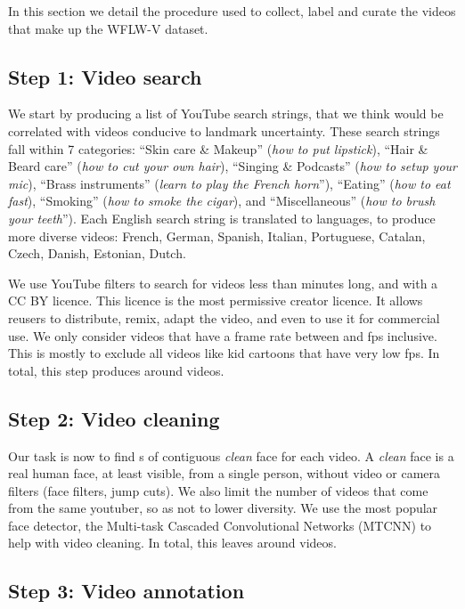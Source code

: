 \documentclass[10pt,twocolumn,letterpaper]{article}
\begin{document}
In this section we detail the procedure used to collect, label and curate the  videos that make up the WFLW-V dataset. 

\subsection*{Step 1: Video search}

We start by producing a list of  YouTube search strings, that we think would be correlated with videos conducive to landmark uncertainty. These search strings fall within 7 categories: ``Skin care \& Makeup'' (\eg \textit{how to put lipstick}), ``Hair \& Beard care'' (\eg \textit{how to cut your own hair}), ``Singing \& Podcasts'' (\eg \textit{how to setup your mic}), ``Brass instruments'' (\eg \textit{learn to play the French horn}''), ``Eating'' (\eg \textit{how to eat fast}), ``Smoking'' (\eg \textit{how to smoke the cigar}), and ``Miscellaneous'' (\eg \textit{how to brush your teeth}''). Each English search string is translated to  languages, to produce more diverse videos: French, German, Spanish, Italian, Portuguese, Catalan, Czech, Danish, Estonian, Dutch.

We use YouTube filters to search for videos less than  minutes long, and with a CC BY licence. This licence is the most permissive creator licence. It allows reusers to distribute, remix, adapt the video, and even to use it for commercial use. We only consider videos that have a frame rate between  and  fps inclusive. This is mostly to exclude all videos like kid cartoons that have very low fps. In total, this step produces around  videos. 

\subsection*{Step 2: Video cleaning}

Our task is now to find s of contiguous \textit{clean} face for each video. A \textit{clean} face is a real human face, at least  visible, from a single person, without video or camera filters (\eg face filters, jump cuts). We also limit the number of videos that come from the same youtuber, so as not to lower diversity. We use the most popular face detector, the Multi-task Cascaded Convolutional Networks (MTCNN) \cite{Zhang2017MTCNN} to help with video cleaning. In total, this leaves around  videos. 

\subsection*{Step 3: Video annotation}
\end{document}
